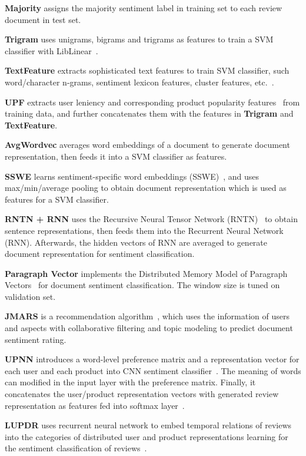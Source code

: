 \documentclass[letterpaper]{article} \usepackage{aaai18}  \usepackage{times}  \usepackage{helvet}  \usepackage{courier}  \usepackage{url}  \usepackage{graphicx}  \frenchspacing  \usepackage{amsmath}
\begin{document}
\textbf{Majority} assigns the majority sentiment label in training set to each review document in test set.

\textbf{Trigram} uses unigrams, bigrams and trigrams as features to train a SVM classifier with LibLinear~\cite{fan2008liblinear}.

\textbf{TextFeature} extracts sophisticated text features to train SVM classifier, such word/character n-grams, sentiment lexicon features, cluster features, etc.~\cite{kiritchenko2014sentiment}.

\textbf{UPF} extracts user leniency and corresponding product popularity features~\cite{gao2013modeling} from training data, and further concatenates them with the features in \textbf{Trigram} and \textbf{TextFeature}.

\textbf{AvgWordvec} averages word embeddings of a document to generate document representation, then feeds it into a SVM classifier as features.

\textbf{SSWE} learns sentiment-specific word embeddings (SSWE)~\cite{tang-EtAl:2014:P14-1}, and uses max/min/average pooling to obtain document representation which is used as features for a SVM classifier.

\textbf{RNTN + RNN} uses the Recursive Neural Tensor Network (RNTN)~\cite{socher2013recursive} to obtain sentence representations, then feeds them into the Recurrent Neural Network (RNN). Afterwards, the hidden vectors of RNN are averaged to generate document representation for sentiment classification.

\textbf{Paragraph Vector} implements the Distributed Memory Model of Paragraph Vectors~\cite{le2014distributed} for document sentiment classification. The window size is tuned on validation set.

\textbf{JMARS} is a recommendation algorithm~\cite{diao2014jointly}, which uses the information of users and aspects with collaborative filtering and topic modeling to predict document sentiment rating.

\textbf{UPNN} introduces a word-level preference matrix and a representation vector for each user and each product into CNN sentiment classifier~\cite{kim2014convolutional}. The meaning of words can modified in the input layer with the preference matrix. Finally, it concatenates the user/product representation vectors with generated review representation as features fed into softmax layer~\cite{tang2015learning}.

\textbf{LUPDR} uses recurrent neural network to embed temporal relations of reviews into the categories of distributed user and product representations learning for the sentiment classification of reviews~\cite{chen2016learning}.
\end{document}

